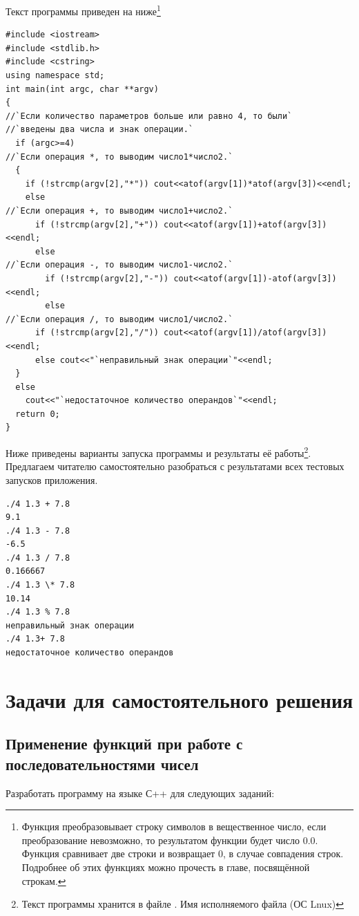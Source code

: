Текст программы приведен на ниже\footnote{Функция  преобразовывает строку символов в вещественное число, если
преобразование невозможно, то результатом функции  будет число 0.0. Функция  сравнивает две строки и
возвращает 0, в случае совпадения строк. Подробнее об этих функциях можно прочесть в главе, посвящённой строкам.}
\begin{lstlisting}
#include <iostream>
#include <stdlib.h>
#include <cstring>
using namespace std;
int main(int argc, char **argv)
{
//`Если количество параметров больше или равно 4, то были`
//`введены два числа и знак операции.`
  if (argc>=4)
//`Если операция *, то выводим число1*число2.`
  {
    if (!strcmp(argv[2],"*")) cout<<atof(argv[1])*atof(argv[3])<<endl;
    else
//`Если операция +, то выводим число1+число2.`
      if (!strcmp(argv[2],"+")) cout<<atof(argv[1])+atof(argv[3])<<endl;
      else 
//`Если операция -, то выводим число1-число2.`
        if (!strcmp(argv[2],"-")) cout<<atof(argv[1])-atof(argv[3])<<endl;
        else 
//`Если операция /, то выводим число1/число2.`
	  if (!strcmp(argv[2],"/")) cout<<atof(argv[1])/atof(argv[3])<<endl;
	  else cout<<"`неправильный знак операции`"<<endl;	
  }
  else
    cout<<"`недостаточное количество операндов`"<<endl;
  return 0;
}
\end{lstlisting}

Ниже приведены варианты запуска программы и результаты её работы\footnote{Текст программы хранится в файле
. Имя исполняемого файла  (ОС Lnux)}. Предлагаем читателю самостоятельно разобраться с
результатами всех тестовых запусков приложения.
\begin{verbatim}
./4 1.3 + 7.8 
9.1 
./4 1.3 - 7.8 
-6.5 
./4 1.3 / 7.8 
0.166667 
./4 1.3 \* 7.8 
10.14 
./4 1.3 % 7.8 
неправильный знак операции 
./4 1.3+ 7.8 
недостаточное количество операндов 
\end{verbatim}

\section[Задачи для самостоятельного решения]{Задачи для самостоятельного решения}
\subsection[Применение функций при работе с последовательностями чисел]{Применение функций при работе с
последовательностями чисел}
Разработать программу на языке С++ для следующих заданий:

